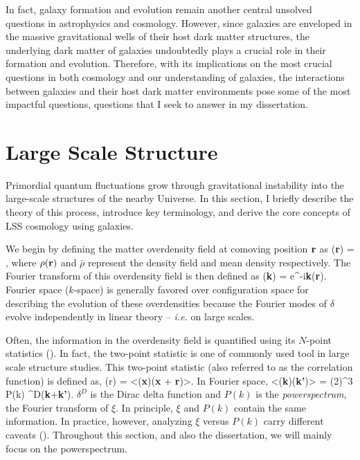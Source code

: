 In fact, galaxy formation and evolution remain another central unsolved questions in
astrophysics and cosmology. However, since galaxies are enveloped in the massive gravitational
wells of their host dark matter structures, the underlying dark matter of galaxies undoubtedly
plays a crucial role in their formation and evolution. Therefore, with its implications on the most
crucial questions in both cosmology and our understanding of galaxies, the interactions between
galaxies and their host dark matter environments pose some of the most impactful questions,
questions that I seek to answer in my dissertation. 


\section{Large Scale Structure}
Primordial quantum fluctuations grow through gravitational instability into 
the large-scale structures of the nearby Universe. In this section, I briefly 
describe the theory of this process, introduce key terminology, and derive
the core concepts of LSS cosmology using galaxies.

We begin by defining the matter overdensity field at comoving position 
${\bf r}$ as
\beq
\delta({\bf r}) = , 
\eeq
where $\rho({\bf r})$ and $\bar{\rho}$ represent the density field and mean density
respectively. The Fourier transform of this overdensity field is then defined as
\beq
\delta({\bf k}) = \int {} e^{-i{\bf k}}\;\delta({\bf r}).
\eeq
Fourier space ($k$-space) is generally favored over configuration space for 
describing the evolution of these overdensities because the Fourier modes 
of $\delta$ evolve independently in linear theory -- \emph{i.e.} on large scales.

Often, the information in the overdensity field is quantified using its 
$N$-point statistics (). In fact, the two-point
statistic is one of commonly used tool in large scale structure studies.
This two-point statistic (also referred to as the correlation function) is
defined as, 
\beq
\xi(r) = <\delta({\bf x})\delta({\bf x} +  {\bf r})>.
\eeq
In Fourier space,
\beq
<\delta({\bf k})\delta({\bf k'})> = (2\pi)^3 P(k) \delta^{D}({\bf k}+{\bf k'}).
\eeq
$\delta^{D}$ is the Dirac delta function and $P(k)$ is the {\em powerspectrum}, 
the Fourier transform of $\xi$. In principle, $\xi$ and $P(k)$ contain the same 
information. In practice, however, analyzing $\xi$ versus $P(k)$ carry different 
caveats (). Throughout this section, and also the dissertation, 
we will mainly focus on the powerspectrum. 

